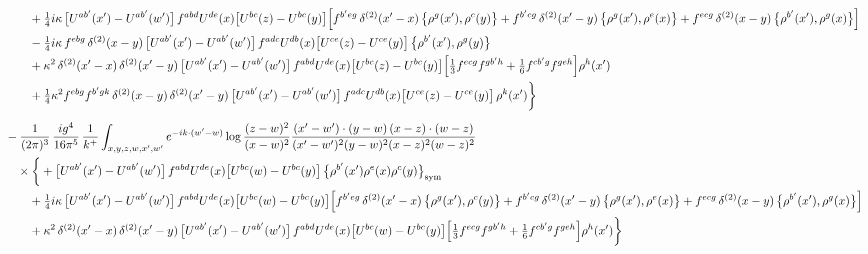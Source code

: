 \documentclass[10pt]{article}
\numberwithin{equation}{section}
\begin{document}
\begin{align}
&\qquad+\tfrac14 i\kappa\,\big[U^{ab^{\prime}}(x^{\prime})-U^{ab^{\prime}}(w^{\prime})\big]\,f^{abd}U^{de}(x)\big[U^{bc}(z)-U^{bc}(y)\big]\Big[f^{b^{\prime}eg}\,\delta^{(2)}(x^{\prime}-x)\,\big\{\rho^{g}(x^{\prime}),\rho^{c}(y)\big\}+f^{b^{\prime}cg}\,\delta^{(2)}(x^{\prime}-y)\,\big\{\rho^{g}(x^{\prime}),\rho^{e}(x)\big\}+f^{ecg}\,\delta^{(2)}(x-y)\,\big\{\rho^{b^{\prime}}(x^{\prime}),\rho^{g}(x)\big\}\Big]\notag\\
&\qquad-\tfrac14 i\kappa\,f^{ebg}\,\delta^{(2)}(x-y)\,\big[U^{ab^{\prime}}(x^{\prime})-U^{ab^{\prime}}(w^{\prime})\big]\,f^{adc}U^{db}(x)\big[U^{ce}(z)-U^{ce}(y)\big]\,\big\{\rho^{b^{\prime}}(x^{\prime}),\rho^{g}(y)\big\}\notag\\
&\qquad+\kappa^{2}\,\delta^{(2)}(x^{\prime}-x)\,\delta^{(2)}(x^{\prime}-y)\,\big[U^{ab^{\prime}}(x^{\prime})-U^{ab^{\prime}}(w^{\prime})\big]\,f^{abd}U^{de}(x)\big[U^{bc}(z)-U^{bc}(y)\big]\Big[\tfrac13f^{ecg}f^{gb^{\prime}h}+\tfrac16f^{cb^{\prime}g}f^{geh}\Big]\rho^{h}(x^{\prime})\notag\\
&\qquad+\tfrac14\kappa^{2}f^{ebg}f^{b^{\prime}gk}\,\delta^{(2)}(x-y)\,\delta^{(2)}(x^{\prime}-y)\,\big[U^{ab^{\prime}}(x^{\prime})-U^{ab^{\prime}}(w^{\prime})\big]\,f^{adc}U^{db}(x)\big[U^{ce}(z)-U^{ce}(y)\big]\,\rho^{k}(x^{\prime})\bigg\}\notag\\[6pt]
&-\frac{1}{(2\pi)^{3}}\,\frac{ig^{4}}{16\pi^{5}}\,\frac{1}{k^{+}}\int_{x,y,z,w,x^{\prime},w^{\prime}}e^{-ik\cdot(w^{\prime}-w)}\log\frac{(z-w)^{2}}{(x-w)^{2}}\frac{(x^{\prime}-w^{\prime})\cdot(y-w)\,(x-z)\cdot(w-z)}{(x^{\prime}-w^{\prime})^{2}(y-w)^{2}(x-z)^{2}(w-z)^{2}}\notag\\
&\quad\times\bigg\{+\big[U^{ab^{\prime}}(x^{\prime})-U^{ab^{\prime}}(w^{\prime})\big]\,f^{abd}U^{de}(x)\big[U^{bc}(w)-U^{bc}(y)\big]\,\big\{\rho^{b^{\prime}}(x^{\prime})\rho^{e}(x)\rho^{c}(y)\big\}_{\rm sym}\notag\\
&\qquad+\tfrac14 i\kappa\,\big[U^{ab^{\prime}}(x^{\prime})-U^{ab^{\prime}}(w^{\prime})\big]\,f^{abd}U^{de}(x)\big[U^{bc}(w)-U^{bc}(y)\big]\Big[f^{b^{\prime}eg}\,\delta^{(2)}(x^{\prime}-x)\,\big\{\rho^{g}(x^{\prime}),\rho^{c}(y)\big\}+f^{b^{\prime}cg}\,\delta^{(2)}(x^{\prime}-y)\,\big\{\rho^{g}(x^{\prime}),\rho^{e}(x)\big\}+f^{ecg}\,\delta^{(2)}(x-y)\,\big\{\rho^{b^{\prime}}(x^{\prime}),\rho^{g}(x)\big\}\Big]\notag\\
&\qquad+\kappa^{2}\,\delta^{(2)}(x^{\prime}-x)\,\delta^{(2)}(x^{\prime}-y)\,\big[U^{ab^{\prime}}(x^{\prime})-U^{ab^{\prime}}(w^{\prime})\big]\,f^{abd}U^{de}(x)\big[U^{bc}(w)-U^{bc}(y)\big]\Big[\tfrac13f^{ecg}f^{gb^{\prime}h}+\tfrac16f^{cb^{\prime}g}f^{geh}\Big]\rho^{h}(x^{\prime})\bigg\}\notag\\[6pt]

\end{align}
\end{document}
